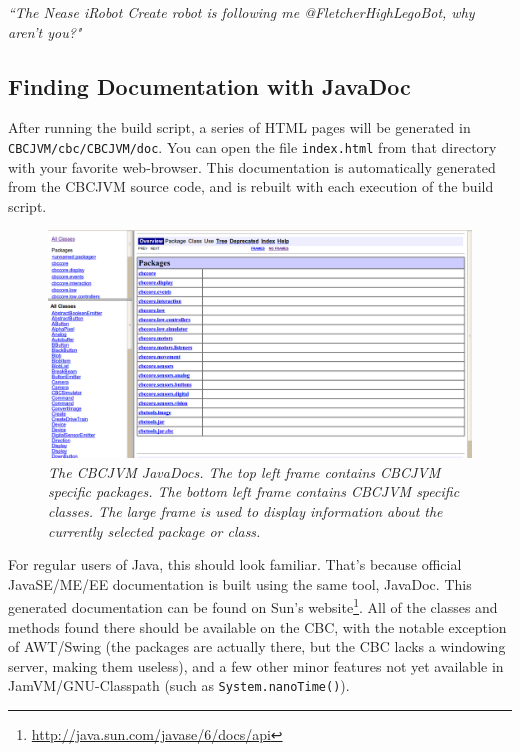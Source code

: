 \documentclass[12pt,letterpaper]{article}
\newcommand{\urlfootnote}[1]{\footnote{\url{#1}}}
\begin{document}
\textit{``The Nease iRobot Create robot is following me @FletcherHighLegoBot, why aren't you?"}



\subsection{Finding Documentation with JavaDoc}

After running the build script, a series of HTML pages will be generated in \texttt{CBCJVM/\-cbc/\-CBCJVM/\-doc}. You can open the file \texttt{index.html} from that directory with your favorite web-browser. This documentation is automatically generated from the CBCJVM source code, and is rebuilt with each execution of the build script.

\begin{figure}[h]
\includegraphics[width=\textwidth]{javadocs.png}
\caption{\textit{The CBCJVM JavaDocs. The top left frame contains CBCJVM specific packages. The bottom left frame contains CBCJVM specific classes. The large frame is used to display information about the currently selected package or class.}}
\end{figure}

For regular users of Java, this should look familiar. That's because official JavaSE/\-ME/\-EE documentation is built using the same tool, JavaDoc. This generated documentation can be found on Sun's website\urlfootnote{http://java.sun.com/javase/6/docs/api}. All of the classes and methods found there should be available on the CBC, with the notable exception of AWT/\-Swing (the packages are actually there, but the CBC lacks a windowing server, making them useless), and a few other minor features not yet available in JamVM/\-GNU-Classpath (such as \texttt{System.\-nanoTime()}).
\end{document}
